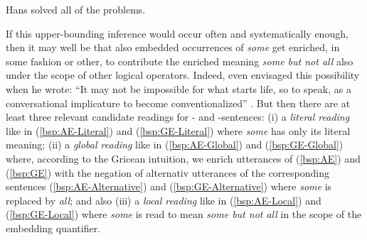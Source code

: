 \documentclass[fleqn,reqno,10pt]{article}
\newcommand{\as}{\acro{as}}
\renewcommand{\es}{\acro{es}}
\begin{document}
\begin{exe}
    \begin{xlist}
       \label{bsp:Plain-SI-Alternative} Hans solved all of the problems.
    \end{xlist}
\end{exe}

\noindent If this upper-bounding inference would occur often and
systematically enough, then it may well be that also embedded
occurrences of \emph{some} get enriched, in some fashion or other, to
contribute the enriched meaning \emph{some but not all} also under the
scope of other logical operators. Indeed, even
\citeauthor{Grice1975:Logic-and-Conve} envisaged this possibility when
he wrote: ``It may not be impossible for what starts life, so to
speak, as a conversational implicature to become conventionalized''
\citep[p.58]{Grice1975:Logic-and-Conve}. But then there are at least
three relevant candidate readings for \as- and \es-sentences: (i) a
\emph{literal reading} like in (\ref{bsp:AE-Literal}) and
(\ref{bsp:GE-Literal}) where \emph{some} has only its literal meaning;
(ii) a \emph{global reading} like in (\ref{bsp:AE-Global}) and
(\ref{bsp:GE-Global}) where, according to the Gricean intuition, we
enrich utterances of (\ref{bsp:AE}) and (\ref{bsp:GE}) with the
negation of alternativ utterances of the corresponding sentences
(\ref{bsp:AE-Alternative}) and (\ref{bsp:GE-Alternative}) where
\emph{some} is replaced by \emph{all}; and also (iii) a \emph{local
  reading} like in (\ref{bsp:AE-Local}) and (\ref{bsp:GE-Local}) where
\emph{some} is read to mean \emph{some but not all} in the scope of
the embedding quantifier.


\setcounter{exx}{0}
\end{document}
